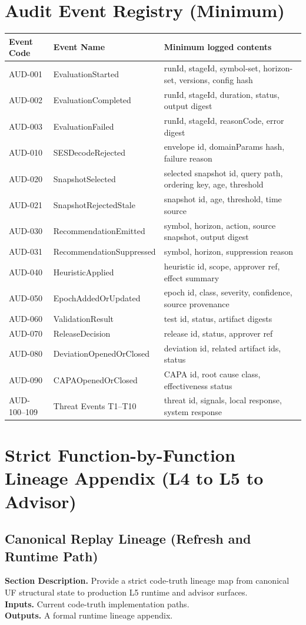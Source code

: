 \documentclass[11pt]{report}
\newcommand{\meta}[3]{\textbf{Section Description.} #1\\
\textbf{Inputs.} #2\\
\textbf{Outputs.} #3\par}
\begin{document}
\chapter{Audit Event Registry (Minimum)}
\begin{longtable}{p{}p{}p{}}
\toprule
Event Code & Event Name & Minimum logged contents \\
\midrule
AUD-001 & EvaluationStarted & runId, stageId, symbol-set, horizon-set, versions, config hash \\
AUD-002 & EvaluationCompleted & runId, stageId, duration, status, output digest \\
AUD-003 & EvaluationFailed & runId, stageId, reasonCode, error digest \\
AUD-010 & SESDecodeRejected & envelope id, domainParams hash, failure reason \\
AUD-020 & SnapshotSelected & selected snapshot id, query path, ordering key, age, threshold \\
AUD-021 & SnapshotRejectedStale & snapshot id, age, threshold, time source \\
AUD-030 & RecommendationEmitted & symbol, horizon, action, source snapshot, output digest \\
AUD-031 & RecommendationSuppressed & symbol, horizon, suppression reason \\
AUD-040 & HeuristicApplied & heuristic id, scope, approver ref, effect summary \\
AUD-050 & EpochAddedOrUpdated & epoch id, class, severity, confidence, source provenance \\
AUD-060 & ValidationResult & test id, status, artifact digests \\
AUD-070 & ReleaseDecision & release id, status, approver ref \\
AUD-080 & DeviationOpenedOrClosed & deviation id, related artifact ids, status \\
AUD-090 & CAPAOpenedOrClosed & CAPA id, root cause class, effectiveness status \\
AUD-100--109 & Threat Events T1--T10 & threat id, signals, local response, system response \\
\bottomrule
\end{longtable}
\chapter{Strict Function-by-Function Lineage Appendix (L4 to L5 to Advisor)}
\section{Canonical Replay Lineage (Refresh and Runtime Path)}
\meta{Provide a strict code-truth lineage map from canonical UF structural state to production L5 runtime and advisor surfaces.}{Current code-truth implementation paths.}{A formal runtime lineage appendix.}
\end{document}

